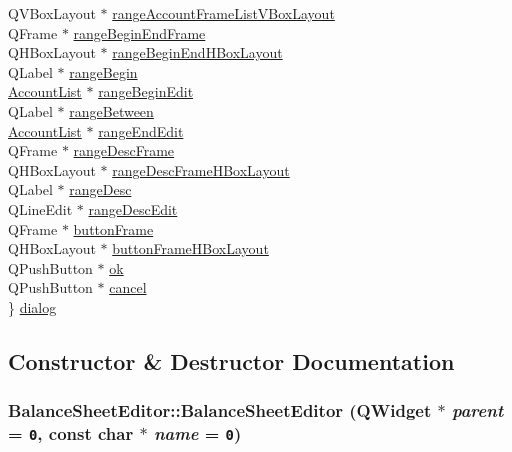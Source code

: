 \begin{CompactItemize}
\begin{tabbing}
\>QVBoxLayout $\ast$ \hyperlink{classBalanceSheetEditor_r18}{rangeAccountFrameListVBoxLayout}\\
\>QFrame $\ast$ \hyperlink{classBalanceSheetEditor_r19}{rangeBeginEndFrame}\\
\>QHBoxLayout $\ast$ \hyperlink{classBalanceSheetEditor_r20}{rangeBeginEndHBoxLayout}\\
\>QLabel $\ast$ \hyperlink{classBalanceSheetEditor_r21}{rangeBegin}\\
\>\hyperlink{classAccountList}{AccountList} $\ast$ \hyperlink{classBalanceSheetEditor_r22}{rangeBeginEdit}\\
\>QLabel $\ast$ \hyperlink{classBalanceSheetEditor_r23}{rangeBetween}\\
\>\hyperlink{classAccountList}{AccountList} $\ast$ \hyperlink{classBalanceSheetEditor_r24}{rangeEndEdit}\\
\>QFrame $\ast$ \hyperlink{classBalanceSheetEditor_r25}{rangeDescFrame}\\
\>QHBoxLayout $\ast$ \hyperlink{classBalanceSheetEditor_r26}{rangeDescFrameHBoxLayout}\\
\>QLabel $\ast$ \hyperlink{classBalanceSheetEditor_r27}{rangeDesc}\\
\>QLineEdit $\ast$ \hyperlink{classBalanceSheetEditor_r28}{rangeDescEdit}\\
\>QFrame $\ast$ \hyperlink{classBalanceSheetEditor_r29}{buttonFrame}\\
\>QHBoxLayout $\ast$ \hyperlink{classBalanceSheetEditor_r30}{buttonFrameHBoxLayout}\\
\>QPushButton $\ast$ \hyperlink{classBalanceSheetEditor_r31}{ok}\\
\>QPushButton $\ast$ \hyperlink{classBalanceSheetEditor_r32}{cancel}\\
\} \hyperlink{classBalanceSheetEditor_r33}{dialog}\\

\end{tabbing}\end{CompactItemize}


\subsection{Constructor \& Destructor Documentation}
\hypertarget{classBalanceSheetEditor_a0}{
\subsubsection[BalanceSheetEditor]{\setlength{\rightskip}{0pt plus 5cm}Balance\-Sheet\-Editor::Balance\-Sheet\-Editor (QWidget $\ast$ {\em parent} = {\tt 0}, const char $\ast$ {\em name} = {\tt 0})}}
\label{classBalanceSheetEditor_a0}


